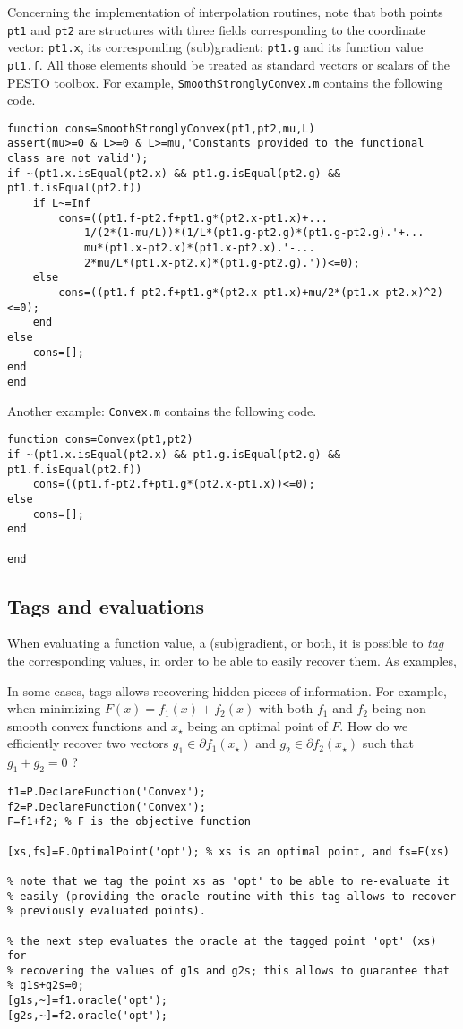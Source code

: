 \documentclass[11pt,a4paper]{article}
\begin{document}
Concerning the implementation of interpolation routines, note that both points \verb?pt1? and \verb?pt2? are structures with three fields corresponding to the coordinate vector: \verb?pt1.x?, its corresponding (sub)gradient: \verb?pt1.g? and its function value \verb?pt1.f?. All those elements should be treated as standard vectors or scalars of the PESTO toolbox. For example, \verb?SmoothStronglyConvex.m? contains the following code.\\[-1cm]

\begin{lstlisting}
function cons=SmoothStronglyConvex(pt1,pt2,mu,L)
assert(mu>=0 & L>=0 & L>=mu,'Constants provided to the functional class are not valid');
if ~(pt1.x.isEqual(pt2.x) && pt1.g.isEqual(pt2.g) && pt1.f.isEqual(pt2.f))
    if L~=Inf
        cons=((pt1.f-pt2.f+pt1.g*(pt2.x-pt1.x)+...
            1/(2*(1-mu/L))*(1/L*(pt1.g-pt2.g)*(pt1.g-pt2.g).'+...
            mu*(pt1.x-pt2.x)*(pt1.x-pt2.x).'-...
            2*mu/L*(pt1.x-pt2.x)*(pt1.g-pt2.g).'))<=0);
    else
        cons=((pt1.f-pt2.f+pt1.g*(pt2.x-pt1.x)+mu/2*(pt1.x-pt2.x)^2)<=0);
    end    
else
    cons=[];
end
end
\end{lstlisting}
\newpage
Another example: \verb?Convex.m? contains the following code.\\[-1cm]
\begin{lstlisting}
function cons=Convex(pt1,pt2)
if ~(pt1.x.isEqual(pt2.x) && pt1.g.isEqual(pt2.g) && pt1.f.isEqual(pt2.f))
    cons=((pt1.f-pt2.f+pt1.g*(pt2.x-pt1.x))<=0);
else
    cons=[];
end

end
\end{lstlisting}
\newpage
\subsection{Tags and evaluations}\label{sec:tags}
When evaluating a function value, a (sub)gradient, or both, it is possible to \emph{tag} the corresponding values, in order to be able to easily recover them. As examples,


In some cases, tags allows recovering hidden pieces of information. For example, when minimizing $F(x)=f_1(x)+f_2(x)$ with both $f_1$ and $f_2$ being non-smooth convex functions and $x_\star$ being an optimal point of $F$.  How do we efficiently recover two vectors $g_1\in\partial f_1(x_\star)$ and $g_2\in\partial f_2(x_\star)$ such that $g_1+g_2=0$ ?\\[-1cm]
\begin{lstlisting}
f1=P.DeclareFunction('Convex');
f2=P.DeclareFunction('Convex');
F=f1+f2; % F is the objective function

[xs,fs]=F.OptimalPoint('opt'); % xs is an optimal point, and fs=F(xs)

% note that we tag the point xs as 'opt' to be able to re-evaluate it
% easily (providing the oracle routine with this tag allows to recover
% previously evaluated points).

% the next step evaluates the oracle at the tagged point 'opt' (xs) for
% recovering the values of g1s and g2s; this allows to guarantee that
% g1s+g2s=0;
[g1s,~]=f1.oracle('opt');
[g2s,~]=f2.oracle('opt');
\end{lstlisting}
\end{document}
